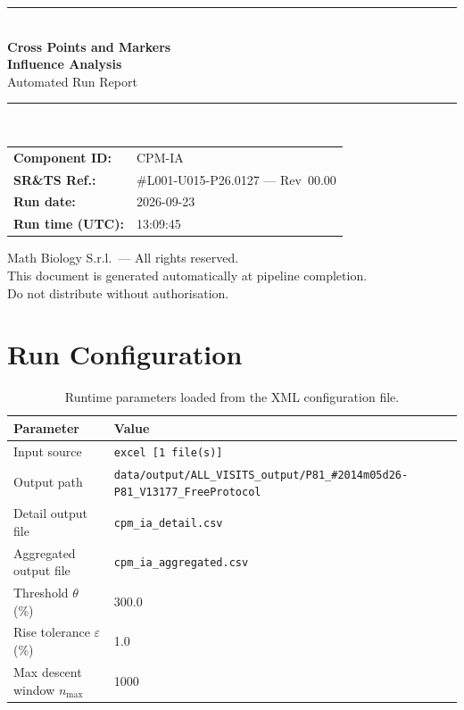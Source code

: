 \documentclass[a4paper,11pt]{article}
\begin{document}
\begin{titlepage}
\begin{center}
  \vspace*{1.8cm}
  {\color{dmaaccent}\rule{\linewidth}{1.5pt}}\\[0.6cm]
  {\LARGE\bfseries\color{dmaaccent}
    Cross Points and Markers\\[0.25cm]
    Influence Analysis}\\[0.4cm]
  {\Large Automated Run Report}\\[0.3cm]
  {\color{dmaaccent}\rule{\linewidth}{1.5pt}}\\[2cm]

  \begin{tabular}{ll}
    \textbf{Component ID:}   & CPM-IA \\[0.3cm]
    \textbf{SR\&TS Ref.:}    & \#L001-U015-P26.0127 --- Rev~00.00 \\[0.3cm]
    \textbf{Run date:}       & 2026-09-23 \\[0.3cm]
    \textbf{Run time (UTC):} & 13:09:45 \\
  \end{tabular}

  \vfill
  {\color{dmagray}\small
    Math Biology S.r.l.\ --- All rights reserved.\\
    This document is generated automatically at pipeline completion.\\
    Do not distribute without authorisation.}
\end{center}
\end{titlepage}

\tableofcontents
\clearpage

\section{Run Configuration}

\begin{table}[h!]
\centering
\small
\caption{Runtime parameters loaded from the XML configuration file.}
\begin{tabular}{ll}
\toprule
\textbf{Parameter} & \textbf{Value} \\
\midrule
Input source                      & \texttt{excel [1 file(s)]} \\
Output path                       & \texttt{data/output/ALL\_VISITS\_output/P81\_\#2014m05d26-P81\_V13177\_FreeProtocol} \\
Detail output file                & \texttt{cpm\_ia\_detail.csv} \\
Aggregated output file            & \texttt{cpm\_ia\_aggregated.csv} \\
Threshold $\theta$ (\%)           & 300.0 \\
Rise tolerance $\varepsilon$ (\%) & 1.0 \\
Max descent window $n_{\max}$     & 1000 \\
\bottomrule
\end{tabular}
\end{table}
\end{document}
